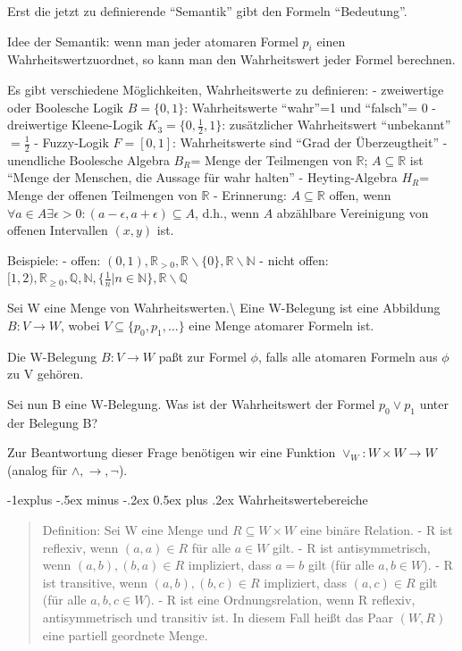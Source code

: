\documentclass[a4paper]{article}
\makeatletter
\renewcommand{\subsection}{\@startsection{subsection}{2}{0mm}%
                {-1explus -.5ex minus -.2ex}%
                {0.5ex plus .2ex}%
                {\normalfont\normalsize\bfseries}}
\makeatother
\begin{document}
\begin{multicols}{3}
  Erst die jetzt zu definierende ``Semantik'' gibt den Formeln
  ``Bedeutung''.

  Idee der Semantik: wenn man jeder atomaren Formel $p_i$ einen
  Wahrheitswertzuordnet, so kann man den Wahrheitswert jeder Formel
  berechnen.

  Es gibt verschiedene Möglichkeiten, Wahrheitswerte zu definieren: -
  zweiwertige oder Boolesche Logik $B=\{0,1\}$: Wahrheitswerte ``wahr''=1
  und ``falsch''= 0 - dreiwertige Kleene-Logik $K_3=\{0,\frac{1}{2},1\}$:
  zusätzlicher Wahrheitswert ``unbekannt''$=\frac{1}{2}$ - Fuzzy-Logik
  $F=[0,1]$: Wahrheitswerte sind ``Grad der Überzeugtheit'' - unendliche
  Boolesche Algebra $B_R$= Menge der Teilmengen von $\mathbb{R}$;
  $A\subseteq\mathbb{R}$ ist ``Menge der Menschen, die Aussage für wahr
  halten'' - Heyting-Algebra $H_R$= Menge der offenen Teilmengen von
  $\mathbb{R}$ - Erinnerung: $A\subseteq\mathbb{R}$ offen, wenn
  $\forall a\in A\exists\epsilon >0:(a-\epsilon,a+\epsilon)\subseteq A$,
  d.h., wenn $A$ abzählbare Vereinigung von offenen Intervallen $(x,y)$
  ist.

  Beispiele: - offen:
  $(0,1), \mathbb{R}_{>0}, \mathbb{R}\backslash\{0\}, \mathbb{R}\backslash\mathbb{N}$
  - nicht offen:
  $[1,2), \mathbb{R}_{\geq 0}, \mathbb{Q}, \mathbb{N}, \{\frac{1}{n} | n\in\mathbb{N}\}, \mathbb{R}\backslash\mathbb{Q}$

  Sei W eine Menge von Wahrheitswerten.\textbackslash{} Eine W-Belegung
  ist eine Abbildung $B:V\rightarrow W$, wobei
  $V\subseteq\{p_0 ,p_1 ,...\}$ eine Menge atomarer Formeln ist.

  Die W-Belegung $B:V\rightarrow W$ paßt zur Formel $\phi$, falls alle
  atomaren Formeln aus $\phi$ zu V gehören.

  Sei nun B eine W-Belegung. Was ist der Wahrheitswert der Formel
  $p_0\vee p_1$ unter der Belegung B?

  Zur Beantwortung dieser Frage benötigen wir eine Funktion
  $\vee_W :W\times W\rightarrow W$ (analog für
  $\wedge,\rightarrow,\lnot$).

  \subsection{Wahrheitswertebereiche}\label{wahrheitswertebereiche}

  \begin{quote}
    Definition: Sei W eine Menge und $R\subseteq W\times W$ eine binäre
    Relation. - R ist reflexiv, wenn $(a,a)\in R$ für alle $a\in W$ gilt. -
    R ist antisymmetrisch, wenn $(a,b),(b,a)\in R$ impliziert, dass $a=b$
    gilt (für alle $a,b\in W$). - R ist transitive, wenn $(a,b),(b,c)\in R$
    impliziert, dass $(a,c)\in R$ gilt (für alle $a,b,c\in W$). - R ist eine
    Ordnungsrelation, wenn R reflexiv, antisymmetrisch und transitiv ist. In
    diesem Fall heißt das Paar $(W,R)$ eine partiell geordnete Menge.
  \end{quote}


\end{multicols}
\end{document}
